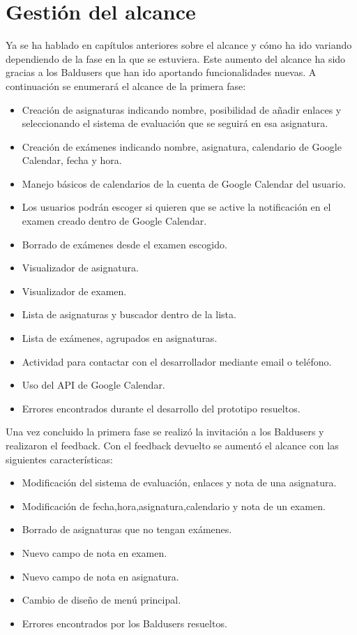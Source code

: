 \section{Gestión del alcance}
\label{secc:Gestión del alcance}

Ya se ha hablado en capítulos anteriores sobre el alcance y cómo ha ido variando dependiendo de la fase en la que se estuviera. Este aumento del alcance ha sido gracias a los Baldusers que han ido aportando funcionalidades nuevas.
A continuación se enumerará el alcance de la primera fase:
\begin{itemize}
	\item Creación de asignaturas indicando nombre, posibilidad de añadir enlaces y seleccionando el sistema de evaluación que se seguirá en esa asignatura. 
	\item Creación de exámenes indicando nombre, asignatura, calendario de Google Calendar, fecha y hora.
	\item Manejo básicos de calendarios de la cuenta de Google Calendar del usuario. 
	\item Los usuarios podrán escoger si quieren que se active la notificación en el examen creado dentro de Google Calendar.
	\item Borrado de exámenes desde el examen escogido.
	\item Visualizador de asignatura.
	\item Visualizador de examen.
	\item Lista de asignaturas y buscador dentro de la lista.
	\item Lista de exámenes, agrupados en asignaturas.
	\item Actividad para contactar con el desarrollador mediante email o teléfono.
	\item Uso del API de Google Calendar.
	\item Errores encontrados durante el desarrollo del prototipo resueltos.
\end{itemize}
\newpage
Una vez concluido la primera fase se realizó la invitación a los Baldusers y realizaron el feedback. Con el feedback devuelto se aumentó el alcance con las siguientes características:
\begin{itemize}
	\item Modificación del sistema de evaluación, enlaces y nota de una asignatura.
	\item Modificación de fecha,hora,asignatura,calendario y nota de un examen.
	\item Borrado de asignaturas que no tengan exámenes.
	\item Nuevo campo de nota en examen.
	\item Nuevo campo de nota en asignatura.
	\item Cambio de diseño de menú principal.
	\item Errores encontrados por los Baldusers resueltos.
\end{itemize}
